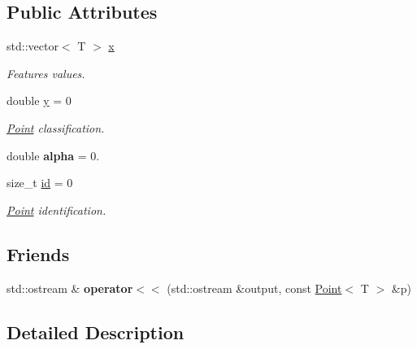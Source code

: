 \subsection*{Public Attributes}
\begin{DoxyCompactItemize}
\item 
\mbox{\label{class_point_a8b8cc26f89935fdc83ed464c053c0476}} 
std\+::vector$<$ T $>$ \hyperlink{class_point_a8b8cc26f89935fdc83ed464c053c0476}{x}
\begin{DoxyCompactList}\small\item\em Features values. \end{DoxyCompactList}\item 
\mbox{\label{class_point_abd1a56102bc430eb08fc37dac9aa4c0b}} 
double \hyperlink{class_point_abd1a56102bc430eb08fc37dac9aa4c0b}{y} = 0
\begin{DoxyCompactList}\small\item\em \hyperlink{class_point}{Point} classification. \end{DoxyCompactList}\item 
\mbox{\label{class_point_aa852a1c045d196abd841a6e1e87c27d8}} 
double {\bfseries alpha} = 0.
\item 
\mbox{\label{class_point_af7d6dfc3296421e9f10311d29720aa3b}} 
size\+\_\+t \hyperlink{class_point_af7d6dfc3296421e9f10311d29720aa3b}{id} = 0
\begin{DoxyCompactList}\small\item\em \hyperlink{class_point}{Point} identification. \end{DoxyCompactList}\end{DoxyCompactItemize}
\subsection*{Friends}
\begin{DoxyCompactItemize}
\item 
\mbox{\label{class_point_ae01781a3264312efb15b109d37fceb38}} 
std\+::ostream \& {\bfseries operator$<$$<$} (std\+::ostream \&output, const \hyperlink{class_point}{Point}$<$ T $>$ \&p)
\end{DoxyCompactItemize}


\subsection{Detailed Description}
